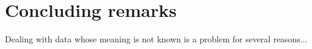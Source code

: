 \chapter{Concluding remarks}

Dealing with data whose meaning is not known is a problem for several reasons...